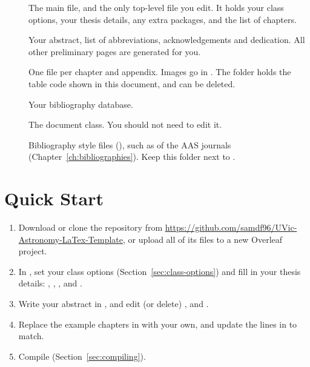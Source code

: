 \begin{description}
    \item[] The main file, and the only top-level  file you edit. It holds your class options, your thesis details, any extra packages, and the list of chapters.
    \item[] Your abstract, list of abbreviations, acknowledgements and dedication. All other preliminary pages are generated for you.
    \item[] One file per chapter and appendix. Images go in . The  folder holds the table code shown in this document, and can be deleted.
    \item[] Your bibliography database.
    \item[] The document class. You should not need to edit it.
    \item[] Bibliography style files (), such as  of the AAS journals (Chapter~\ref{ch:bibliographies}). Keep this folder next to .
\end{description}

\section{Quick Start}
\label{sec:quick-start}

\begin{enumerate}
    \item Download or clone the repository from \url{https://github.com/samdf96/UVic-Astronomy-LaTex-Template}, or upload all of its files to a new Overleaf project.
    \item In , set your class options (Section~\ref{sec:class-options}) and fill in your thesis details: , , ,  and .
    \item Write your abstract in , and edit (or delete) ,  and .
    \item Replace the example chapters in  with your own, and update the  lines in  to match.
    \item Compile (Section~\ref{sec:compiling}).
\end{enumerate}

